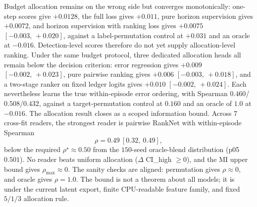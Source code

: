 Budget allocation remains on the wrong side but converges monotonically:
one-step scores give $+0.0128$, the full loss gives $+0.011$, pure horizon
supervision gives $+0.0072$, and horizon supervision with ranking loss gives
$+0.0075$ $[-0.003,\ +0.020]$, against a label-permutation control at
$+0.031$ and an oracle at $-0.016$.  Detection-level scores therefore do not
yet supply allocation-level ranking.  Under the same budget protocol, three
dedicated allocation heads all remain below the decision criterion: error
regression gives $+0.009$ $[-0.002,\ +0.023]$, pure pairwise ranking gives
$+0.006$ $[-0.003,\ +0.018]$, and a two-stage ranker on fixed ledger logits
gives $+0.010$ $[-0.002,\ +0.024]$.  Each nevertheless learns the true
within-episode error ordering, with Spearman $0.460$/$0.508$/$0.432$, against a
target-permutation control at $0.160$ and an oracle of $1.0$ at $-0.016$.
The allocation result closes as a scoped information bound.  Across $7$
cross-fit readers, the strongest reader is pairwise RankNet with
within-episode Spearman
$$
\rho = 0.49\ [0.32,\ 0.49],
$$
below the required $\rho^\star \approx 0.50$ from the $150$-seed oracle-blend
distribution (p05 $0.501$).  No reader beats uniform allocation
($\Delta$ CI\_high $\ge 0$), and the MI upper bound gives
$\rho_{\max}\approx 0$.  The sanity checks are aligned: permutation gives
$\rho\approx 0$, and oracle gives $\rho=1.0$.  The bound is not a theorem about
all models; it is under the current latent export, finite CPU-readable feature
family, and fixed $5/1/3$ allocation rule.

